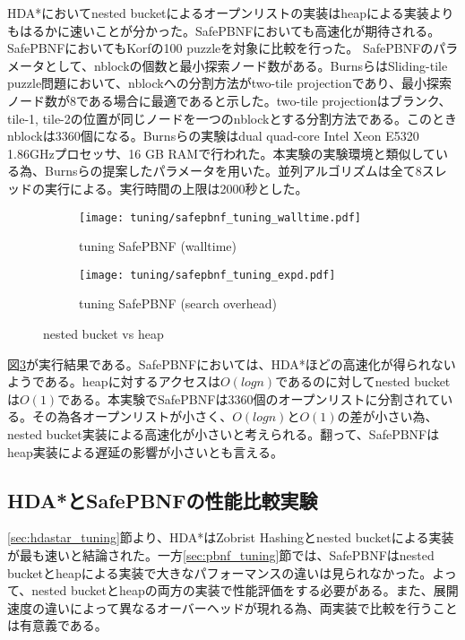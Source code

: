 \documentclass[uplatex]{jsarticle}
\begin{document}
HDA*においてnested bucketによるオープンリストの実装はheapによる実装よりもはるかに速いことが分かった。SafePBNFにおいても高速化が期待される。SafePBNFにおいてもKorfの100 puzzleを対象に比較を行った。
SafePBNFのパラメータとして、nblockの個数と最小探索ノード数がある。BurnsらはSliding-tile puzzle問題において、nblockへの分割方法がtwo-tile projectionであり、最小探索ノード数が8である場合に最適であると示した。two-tile projectionはブランク、tile-1, tile-2の位置が同じノードを一つのnblockとする分割方法である。このときnblockは3360個になる。Burnsらの実験はdual quad-core Intel Xeon E5320 1.86GHzプロセッサ、16 GB RAMで行われた。本実験の実験環境と類似している為、Burnsらの提案したパラメータを用いた。並列アルゴリズムは全て8スレッドの実行による。実行時間の上限は2000秒とした。
\newline

\begin{figure}[h]
	\centering
	\begin{subfigure}{0.4\columnwidth}
		\texttt{[image: tuning/safepbnf\_tuning\_walltime.pdf]}
		\caption{tuning SafePBNF (walltime)}
		\label{fig:safepbnf_tuning_walltime}
	\end{subfigure}
	\begin{subfigure}{0.4\columnwidth}
		\texttt{[image: tuning/safepbnf\_tuning\_expd.pdf]}
		\caption{tuning SafePBNF (search overhead)}
		\label{fig:safepbnf_tuning_expd}
	\end{subfigure}
	\caption{nested bucket vs heap}
	\label{fig:safepbnf_tuning}
\end{figure}

図\ref{fig:safepbnf_tuning}が実行結果である。SafePBNFにおいては、HDA*ほどの高速化が得られないようである。heapに対するアクセスは$O(logn)$であるのに対してnested bucketは$O(1)$である。本実験でSafePBNFは3360個のオープンリストに分割されている。その為各オープンリストが小さく、$O(logn)$と$O(1)$の差が小さい為、nested bucket実装による高速化が小さいと考えられる。翻って、SafePBNFはheap実装による遅延の影響が小さいとも言える。

\subsection{HDA*とSafePBNFの性能比較実験}

\ref{sec:hdastar_tuning}節より、HDA*はZobrist Hashingとnested bucketによる実装が最も速いと結論された。一方\ref{sec:pbnf_tuning}節では、SafePBNFはnested bucketとheapによる実装で大きなパフォーマンスの違いは見られなかった。よって、nested bucketとheapの両方の実装で性能評価をする必要がある。また、展開速度の違いによって異なるオーバーヘッドが現れる為、両実装で比較を行うことは有意義である。
\end{document}
